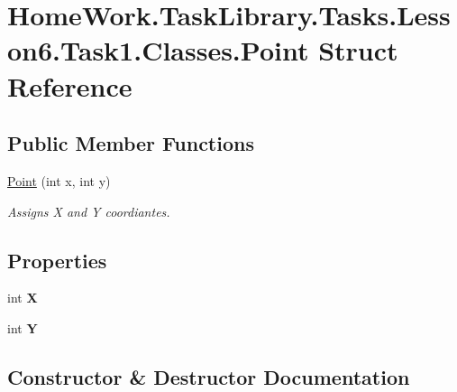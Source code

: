 \hypertarget{struct_home_work_1_1_task_library_1_1_tasks_1_1_lesson6_1_1_task1_1_1_classes_1_1_point}{}\section{Home\+Work.\+Task\+Library.\+Tasks.\+Lesson6.\+Task1.\+Classes.\+Point Struct Reference}
\label{struct_home_work_1_1_task_library_1_1_tasks_1_1_lesson6_1_1_task1_1_1_classes_1_1_point}
\subsection*{Public Member Functions}
\begin{DoxyCompactItemize}
\item 
\mbox{\hyperlink{struct_home_work_1_1_task_library_1_1_tasks_1_1_lesson6_1_1_task1_1_1_classes_1_1_point_a23b25a6292293af24733191625c2dcf2}{Point}} (int x, int y)
\begin{DoxyCompactList}\small\item\em Assigns X and Y coordiantes. \end{DoxyCompactList}\end{DoxyCompactItemize}
\subsection*{Properties}
\begin{DoxyCompactItemize}
\item 
\mbox{\label{struct_home_work_1_1_task_library_1_1_tasks_1_1_lesson6_1_1_task1_1_1_classes_1_1_point_a4c0addefb15cb3c6bbe89a7537655586}} 
int {\bfseries X}
\item 
\mbox{\label{struct_home_work_1_1_task_library_1_1_tasks_1_1_lesson6_1_1_task1_1_1_classes_1_1_point_a7857ea6f50d009875bf7e9fafc010d77}} 
int {\bfseries Y}
\end{DoxyCompactItemize}


\subsection{Constructor \& Destructor Documentation}
\mbox{\label{struct_home_work_1_1_task_library_1_1_tasks_1_1_lesson6_1_1_task1_1_1_classes_1_1_point_a23b25a6292293af24733191625c2dcf2}} 
